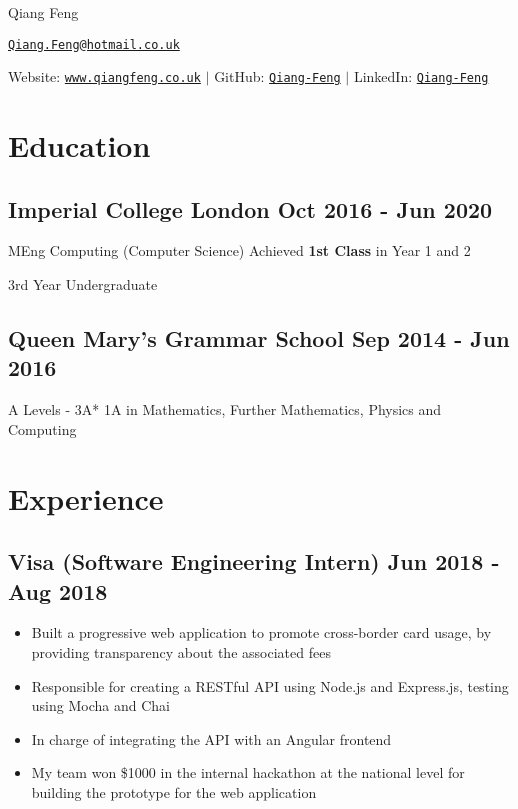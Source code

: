 \documentclass[a4paper]{article}
\begin{document}
\begin{center}
    {\huge Qiang Feng}

    \vspace{2pt}

    \href{mailto:Qiang.Feng@hotmail.co.uk}{\texttt{Qiang.Feng@hotmail.co.uk}}

    \vspace{2pt}

    Website: \href{https://www.qiangfeng.co.uk}{\texttt{www.qiangfeng.co.uk}} $\mid$
    GitHub: \href{https://github.com/Qiang-Feng}{\texttt{Qiang-Feng}} $\mid$
    LinkedIn: \href{https://www.linkedin.com/in/qiang-feng/}{\texttt{Qiang-Feng}}
\end{center}

\section*{Education}

\subsection*{Imperial College London \hfill Oct 2016 - Jun 2020}

MEng Computing (Computer Science) \hfill Achieved \textbf{1st Class} in Year 1 and 2

3rd Year Undergraduate

\subsection*{Queen Mary's Grammar School \hfill Sep 2014 - Jun 2016}

A Levels - 3A* 1A in Mathematics, Further Mathematics, Physics and Computing

\section*{Experience}

\subsection*{Visa \textnormal{(Software Engineering Intern)} \hfill Jun 2018 - Aug 2018}

\begin{itemize}
    \item Built a progressive web application to promote cross-border card usage, by providing transparency about the associated fees
    \item Responsible for creating a RESTful API using Node.js and Express.js, testing using Mocha and Chai
    \item In charge of integrating the API with an Angular frontend
    \item My team won \$1000 in the internal hackathon at the national level for building the prototype for the web application
\end{itemize}
\end{document}
